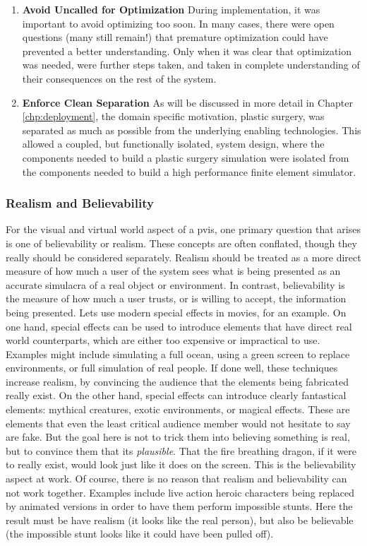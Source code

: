 \begin{enumerate}
\item \textbf{Avoid Uncalled for Optimization} During implementation,
  it was important to avoid optimizing too soon. In many cases, there
  were open questions (many still remain!) that premature optimization
  could have prevented a better understanding. Only when it was clear
  that optimization was needed, were further steps taken, and taken in
  complete understanding of their consequences on the rest of the
  system.

\item \textbf{Enforce Clean Separation} As will be discussed in more
  detail in Chapter \ref{chp:deployment}, the domain specific motivation, plastic surgery, was
  separated as much as possible from the underlying enabling
  technologies. This allowed a coupled, but functionally isolated,
  system design, where the components needed to build a plastic
  surgery simulation were isolated from the components needed to build
  a high performance finite element simulator.
  
\end{enumerate}


\subsubsection{Realism and Believability}

For the visual and virtual world aspect of a \gls{pvis}, one primary
question that arises is one of believability or realism. These
concepts are often conflated, though they really should be considered
separately. Realism should be treated as a more direct measure of how
much a user of the system sees what is being presented as an accurate
simulacra of a real object or environment. In contrast, believability
is the measure of how much a user trusts, or is willing to accept, the
information being presented. Lets use modern special effects in
movies, for an example. On one hand, special effects can be used to
introduce elements that have direct real world counterparts, which are
either too expensive or impractical to use. Examples might include
simulating a full ocean, using a green screen to replace environments,
or full simulation of real people. If done well, these techniques
increase realism, by convincing the audience that the elements being
fabricated really exist. On the other hand, special effects can
introduce clearly fantastical elements: mythical creatures, exotic
environments, or magical effects. These are elements that even the
least critical audience member would not hesitate to say are fake. But
the goal here is not to trick them into believing something is real,
but to convince them that its \textit{plausible}. That the fire
breathing dragon, if it were to really exist, would look just like it
does on the screen. This is the believability aspect at work. Of
course, there is no reason that realism and believability can not work
together. Examples include live action heroic characters being
replaced by animated versions in order to have them perform impossible
stunts. Here the result must be have realism (it looks like the real
person), but also be believable (the impossible stunt looks like it
could have been pulled off).

